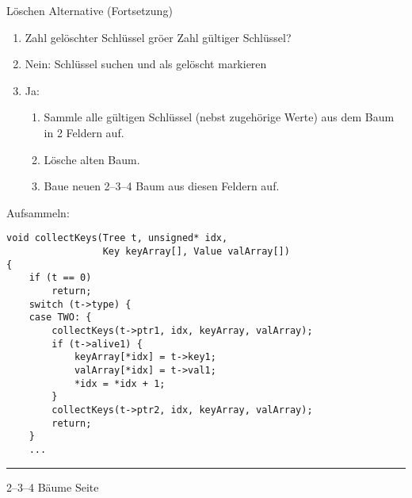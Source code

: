 
\begin{slide}{}
\normalsize

\begin{center}
L\"oschen Alternative (Fortsetzung)
\end{center}
\vspace*{0.5cm}

\footnotesize
\begin{enumerate}
\item Zahl gel\"oschter Schl\"ussel gr\"o\3er Zahl g\"ultiger Schl\"ussel?
\item Nein: Schl\"ussel suchen und als gel\"oscht markieren
\item Ja:
  \begin{enumerate}
  \item Sammle alle  g\"ultigen Schl\"ussel (nebst zugeh\"orige Werte) 
        aus dem Baum in 2 Feldern auf.
  \item L\"osche alten Baum.
  \item Baue neuen 2--3--4 Baum aus diesen Feldern auf.
  \end{enumerate}
\end{enumerate}

Aufsammeln:
\begin{verbatim}
void collectKeys(Tree t, unsigned* idx, 
                 Key keyArray[], Value valArray[]) 
{
    if (t == 0)
        return;
    switch (t->type) {
    case TWO: {
        collectKeys(t->ptr1, idx, keyArray, valArray);
        if (t->alive1) {
            keyArray[*idx] = t->key1;
            valArray[*idx] = t->val1;
            *idx = *idx + 1;
        }
        collectKeys(t->ptr2, idx, keyArray, valArray);
        return;
    }
    ...
\end{verbatim}


\vspace*{\fill}
\tiny \addtocounter{mypage}{1}
\rule{17cm}{1mm}
2--3--4 B\"aume  \hspace*{\fill} Seite 
\end{slide}


